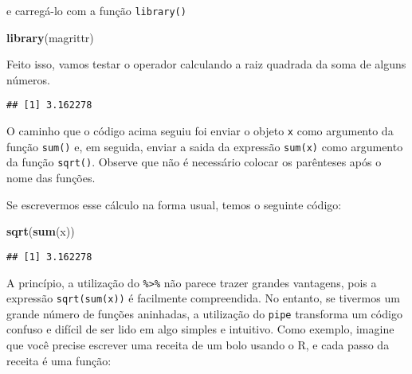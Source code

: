 \documentclass[]{book}
\newenvironment{Shaded}{\begin{snugshade}}{\end{snugshade}}
\newcommand{\KeywordTok}[1]{\textcolor[rgb]{0.13,0.29,0.53}{\textbf{{#1}}}}
\newcommand{\DecValTok}[1]{\textcolor[rgb]{0.00,0.00,0.81}{{#1}}}
\newcommand{\StringTok}[1]{\textcolor[rgb]{0.31,0.60,0.02}{{#1}}}
\newcommand{\NormalTok}[1]{{#1}}
\begin{document}
e carregá-lo com a função \texttt{library()}

\begin{Shaded}
\begin{Highlighting}[]
\KeywordTok{library}\NormalTok{(magrittr)}
\end{Highlighting}
\end{Shaded}

Feito isso, vamos testar o operador calculando a raiz quadrada da soma
de alguns números.

\begin{Shaded}
\end{Shaded}

\begin{verbatim}
## [1] 3.162278
\end{verbatim}

O caminho que o código acima seguiu foi enviar o objeto \texttt{x} como
argumento da função \texttt{sum()} e, em seguida, enviar a saida da
expressão \texttt{sum(x)} como argumento da função \texttt{sqrt()}.
Observe que não é necessário colocar os parênteses após o nome das
funções.

Se escrevermos esse cálculo na forma usual, temos o seguinte código:

\begin{Shaded}
\begin{Highlighting}[]
\KeywordTok{sqrt}\NormalTok{(}\KeywordTok{sum}\NormalTok{(x))}
\end{Highlighting}
\end{Shaded}

\begin{verbatim}
## [1] 3.162278
\end{verbatim}

A princípio, a utilização do \texttt{\%\textgreater{}\%} não parece
trazer grandes vantagens, pois a expressão \texttt{sqrt(sum(x))} é
facilmente compreendida. No entanto, se tivermos um grande número de
funções aninhadas, a utilização do \texttt{pipe} transforma um código
confuso e difícil de ser lido em algo simples e intuitivo. Como exemplo,
imagine que você precise escrever uma receita de um bolo usando o R, e
cada passo da receita é uma função:
\end{document}
